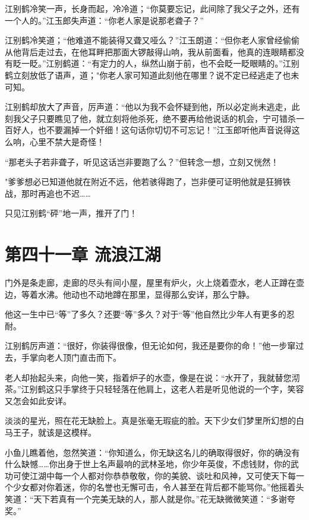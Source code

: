 \documentclass[12pt,oneside]{book}
\begin{document}
江别鹤冷笑一声，长身而起，冷冷道；``你莫要忘记，此间除了我父子之外，还有一个人的。''江玉郎失声道：``你老人家是说那老聋子？''

江别鹤冷笑道；``他难道不能装得又聋又哑么？''江玉朗道：``但你老人家曾经偷偷从他背后走过去，在他耳畔把那面大锣敲得山响，我从前面看，他真的连眼睛都没有眨一眨。''江别鹤道：``有定力的人，纵然山崩于前，也不会眨一眨眼睛的。''江别鹤立刻放低了语声，道；"你老人家可知道此刻他在哪里？说不定已经逃走了也未可知。

江别鹤却放大了声音，厉声道：``他以为我不会怀疑到他，所以必定尚未逃走，此刻我父子只要瞧见了他，就立刻将他杀死，绝不要再给他说话的机会，宁可错杀一百好人，也不要漏掉一个奸细！这句话你切切不可忘记！''江玉郎听他声音说得这么响，心里不禁大是奇怪！

``那老头子若非聋子，听见这话岂非要跑了么？''但转念一想，立刻又恍然！

"爹爹想必已知道他就在附近不远，他若骇得跑了，岂非便可证明他就是狂狮铁战，那时再追也不迟\ldots\ldots{}

只见江别鹤``砰''地一声，推开了门！

\hypertarget{ux7b2cux56dbux5341ux4e00ux7ae0-ux6d41ux6d6aux6c5fux6e56}{%
\chapter{第四十一章
流浪江湖}\label{ux7b2cux56dbux5341ux4e00ux7ae0-ux6d41ux6d6aux6c5fux6e56}}

门外是条走廊，走廊的尽头有间小屋，屋里有炉火，火上烧着壶水，老人正蹲在壶边，等着水沸。他动也不动地蹲在那里，显得那么安详，那么宁静。

他这一生中已``等''了多久？还要``等''多久？对于``等''他自然比少年人有更多的忍耐。

江别鹤厉声道：``很好，你装得很像，但无论如何，我还是要你的命！''他一步窜过去，手掌向老人顶门直击而下。

老人却抬起头来，向他一笑，指着炉子的水壶，像是在说：``水开了，我就替您沏茶。''江别鹤这只手掌终于只轻轻落在他肩上，这老人若是听见他说的一个字，笑容又怎会如此安详。

淡淡的星光，照在花无缺脸上。真是张毫无瑕疵的脸。天下少女们梦里所幻想的白马王子，就该是这模样。

小鱼儿瞧着他，忽然笑道：``你知道么，你无缺这名儿的确取得很好，你的确没有什么缺憾\ldots\ldots 你出身于世上名声最响的武林圣地，你少年英俊，不虑钱财，你的武功可使江湖中每一个人都对你恭恭敬敬，你的美貌、谈吐和风神，又可使天下每一个少女都对你着迷，你的名誉也无懈可击，令人甚至在背后都不能骂你。''他摇着头笑道：``天下若真有一个完美无缺的人，那人就是你。''花无缺微微笑道：``多谢夸奖。''
\end{document}
